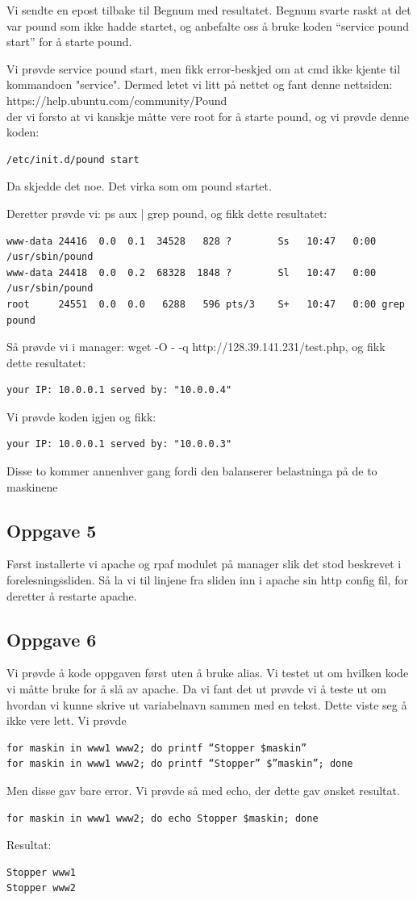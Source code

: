 \documentclass[a4paper, norsk, 12pt]{article}
\begin{document}
Vi sendte en epost tilbake til Begnum med resultatet. Begnum svarte raskt at det var pound som ikke hadde startet, og anbefalte oss å bruke koden “service pound start” for å starte pound.

Vi prøvde service pound start, men fikk error-beskjed om at cmd ikke kjente til kommandoen "service". Dermed letet vi litt på nettet og fant denne nettsiden:  \\ https://help.ubuntu.com/community/Pound\\
der vi forsto at vi kanskje måtte vere root for å starte pound, og vi prøvde denne koden:
\begin{verbatim}
/etc/init.d/pound start
\end{verbatim}
Da skjedde det noe. Det virka som om pound startet.

Deretter prøvde vi: ps aux | grep pound, og fikk dette resultatet:
\begin{verbatim}
www-data 24416  0.0  0.1  34528   828 ?        Ss   10:47   0:00 /usr/sbin/pound
www-data 24418  0.0  0.2  68328  1848 ?        Sl   10:47   0:00 /usr/sbin/pound
root     24551  0.0  0.0   6288   596 pts/3    S+   10:47   0:00 grep pound
\end{verbatim}
Så prøvde vi i manager: wget -O - -q http://128.39.141.231/test.php, og fikk dette resultatet:
\begin{verbatim}
your IP: 10.0.0.1 served by: "10.0.0.4"
\end{verbatim}
Vi prøvde koden igjen og fikk: 
\begin{verbatim}
your IP: 10.0.0.1 served by: "10.0.0.3"
\end{verbatim} 
Disse to kommer annenhver gang fordi den balanserer belastninga på de to maskinene

\subsection{Oppgave 5}
Først installerte vi apache og rpaf modulet på manager slik det stod beskrevet i forelesningssliden. Så la vi til linjene fra sliden inn i apache sin http config fil, for deretter å restarte apache.

\subsection{Oppgave 6}
Vi prøvde å kode oppgaven først uten å bruke alias. Vi testet ut om hvilken kode vi måtte bruke for å slå av apache. Da vi fant det ut prøvde vi å teste ut om hvordan vi kunne skrive ut variabelnavn sammen med en tekst. Dette viste seg å ikke vere lett. Vi prøvde
\begin{verbatim}
for maskin in www1 www2; do printf “Stopper $maskin”
for maskin in www1 www2; do printf “Stopper” $”maskin”; done
\end{verbatim}
Men disse gav bare error. Vi prøvde så med echo, der dette gav ønsket resultat.
\begin{verbatim}
for maskin in www1 www2; do echo Stopper $maskin; done
\end{verbatim}
  Resultat:     
\begin{verbatim}
Stopper www1
Stopper www2
\end{verbatim}
\end{document}
